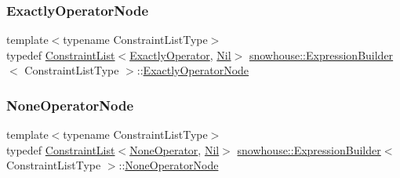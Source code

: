 \mbox{\label{structsnowhouse_1_1ExpressionBuilder_af776b29f6fb154ca3179a31fdbcc92c5}} 
\subsubsection{\texorpdfstring{ExactlyOperatorNode}{ExactlyOperatorNode}}
{\footnotesize\ttfamily template$<$typename Constraint\+List\+Type$>$ \\
typedef \mbox{\hyperlink{structsnowhouse_1_1ConstraintList}{Constraint\+List}}$<$\mbox{\hyperlink{structsnowhouse_1_1ExactlyOperator}{Exactly\+Operator}}, \mbox{\hyperlink{structsnowhouse_1_1Nil}{Nil}}$>$ \mbox{\hyperlink{structsnowhouse_1_1ExpressionBuilder}{snowhouse\+::\+Expression\+Builder}}$<$ Constraint\+List\+Type $>$\+::\mbox{\hyperlink{structsnowhouse_1_1ExpressionBuilder_af776b29f6fb154ca3179a31fdbcc92c5}{Exactly\+Operator\+Node}}}

\mbox{\label{structsnowhouse_1_1ExpressionBuilder_aaf5a1da1881c71098209387a4cf2821a}} 
\subsubsection{\texorpdfstring{NoneOperatorNode}{NoneOperatorNode}}
{\footnotesize\ttfamily template$<$typename Constraint\+List\+Type$>$ \\
typedef \mbox{\hyperlink{structsnowhouse_1_1ConstraintList}{Constraint\+List}}$<$\mbox{\hyperlink{structsnowhouse_1_1NoneOperator}{None\+Operator}}, \mbox{\hyperlink{structsnowhouse_1_1Nil}{Nil}}$>$ \mbox{\hyperlink{structsnowhouse_1_1ExpressionBuilder}{snowhouse\+::\+Expression\+Builder}}$<$ Constraint\+List\+Type $>$\+::\mbox{\hyperlink{structsnowhouse_1_1ExpressionBuilder_aaf5a1da1881c71098209387a4cf2821a}{None\+Operator\+Node}}}

